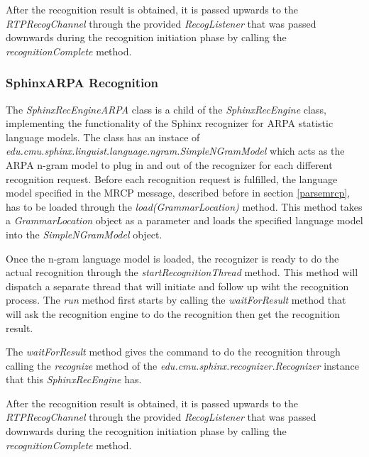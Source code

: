 After the recognition result is obtained, it is passed upwards to the \textit{RTPRecogChannel} through the provided \textit{RecogListener} that was passed downwards during the recognition initiation phase by calling the \textit{recognitionComplete} method.

\subsubsection{SphinxARPA Recognition}
The \textit{SphinxRecEngineARPA} class is a child of the \textit{SphinxRecEngine} class, implementing the functionality of the Sphinx recognizer for ARPA statistic language models.
The class has an instace of \textit{edu.cmu.sphinx.linguist.language.ngram.SimpleNGramModel} which acts as the ARPA n-gram model to plug in and out of the recognizer for each different recognition request.
Before each recognition request is fulfilled, the language model specified in the MRCP message, described before in section \ref{parsemrcp}, has to be loaded through the \textit{load(GrammarLocation)} method.
This method takes a \textit{GrammarLocation} object as a parameter and loads the specified language model into the \textit{SimpleNGramModel} object.


Once the n-gram language model is loaded, the recognizer is ready to do the actual recognition through the \textit{startRecognitionThread} method.
This method will dispatch a separate thread that will initiate and follow up wiht the recognition process.
The \textit{run} method first starts by calling the \textit{waitForResult} method that will ask the recognition engine to do the recognition then get the recognition result.


The \textit{waitForResult} method gives the command to do the recognition through calling the \textit{recognize} method of the \textit{edu.cmu.sphinx.recognizer.Recognizer} instance that this \textit{SphinxRecEngine} has.


After the recognition result is obtained, it is passed upwards to the \textit{RTPRecogChannel} through the provided \textit{RecogListener} that was passed downwards during the recognition initiation phase by calling the \textit{recognitionComplete} method.


